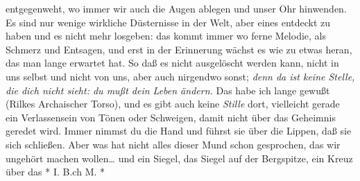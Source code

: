 \documentclass[
]{article}
\begin{document}
entgegenweht, wo immer wir auch die Augen ablegen und unser Ohr
hinwenden. Es sind nur wenige wirkliche Düsternisse in der Welt, aber
eines entdeckt zu haben und es nicht mehr losgeben: das kommt immer wo
ferne Melodie, als Schmerz und Entsagen, und erst in der Erinnerung
wächst es wie zu etwas heran, das man lange erwartet hat. So daß es
nicht ausgelöscht werden kann, nicht in uns selbst und nicht von uns,
aber auch nirgendwo sonst; \emph{denn da ist keine Stelle, die dich
nicht sieht: du mußt dein Leben ändern.} Das habe ich lange gewußt
(Rilkes Archaischer Torso), und es gibt auch keine \emph{Stille} dort,
vielleicht gerade ein Verlassensein von Tönen oder Schweigen, damit
nicht über das Geheimnis geredet wird. Immer nimmst du die Hand und
führst sie über die Lippen, daß sie sich schließen. Aber was hat nicht
alles dieser Mund schon gesprochen, das wir ungehört machen
wollen\ldots{} und ein Siegel, das Siegel auf der Bergspitze, ein Kreuz
über das * I. B.ch M. *
\end{document}
